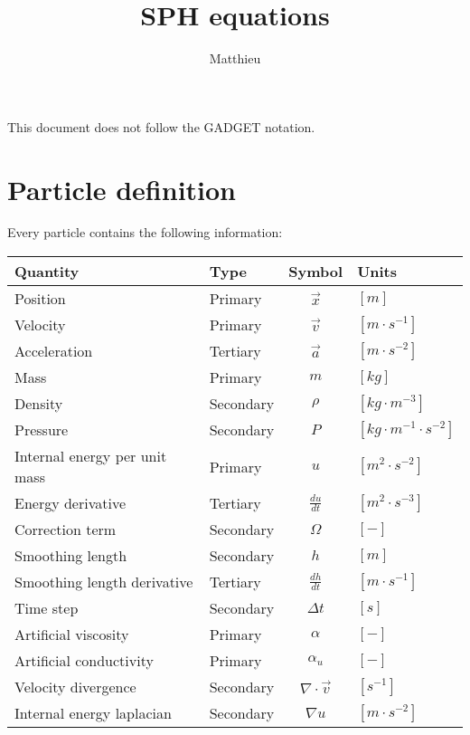\documentclass[a4paper,10pt]{article}
\title{SPH equations}
\author{Matthieu}
\begin{document}
\maketitle

This document does not follow the GADGET notation.\\

\section{Particle definition}
Every particle contains the following information:

\begin{table}[h]
\centering
\begin{tabular}{|l|l|c|l|}
 \hline
 \textbf{Quantity} & \textbf{Type} & \textbf{Symbol} & \textbf{Units} \\
 \hline \hline
 Position & Primary & $\vec{x}$ & $[m]$ \\
 Velocity & Primary &$\vec{v}$ & $[m\cdot s^{-1}]$ \\
 Acceleration & Tertiary &$\vec{a}$ & $[m\cdot s^{-2}]$ \\
 Mass & Primary &$m$ & $[kg]$ \\
 Density & Secondary & $\rho$ & $[kg\cdot m^{-3}]$ \\
 Pressure & Secondary & $P$ & $[kg \cdot m^{-1}\cdot s^{-2}]$ \\
 Internal energy per unit mass & Primary & $u$ & $[m^2 \cdot s^{-2}]$ \\ 
 Energy derivative & Tertiary & $\frac{du}{dt}$ & $[ m^2 \cdot s^{-3}]$ \\
 Correction term & Secondary & $\Omega$ & $[-]$ \\
 Smoothing length & Secondary &$h$ & $[m]$ \\
 Smoothing length derivative & Tertiary &$\frac{dh}{dt}$ & $[m\cdot s^{-1}]$ \\
 Time step & Secondary & $\Delta t$ & $[s]$ \\
\hline
 Artificial viscosity & Primary & $\alpha$ & $[-]$\\
 Artificial conductivity & Primary & $\alpha_u$ & $[-]$\\
 Velocity divergence & Secondary & $\nabla\cdot \vec{v}$ & $[s^{-1}]$ \\
 Internal energy laplacian & Secondary & $\nabla u$ & $[m\cdot s^{-2}]$\\
\hline
\end{tabular} 
\end{table}
\end{document}

